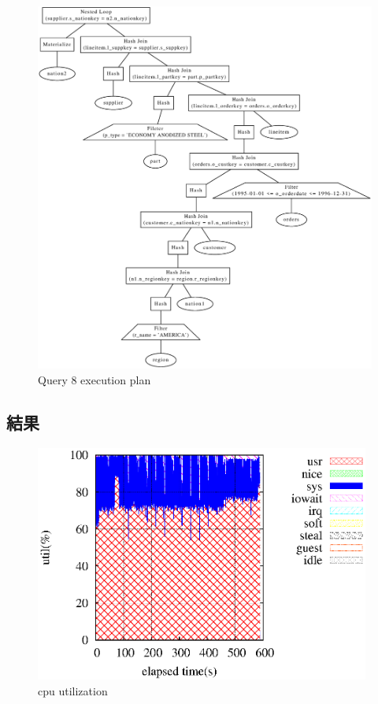 \documentclass[11pt,a4paper]{jsarticle}
\begin{document}
\begin{figure}[thbp]
 \begin{center}
  \includegraphics[width=170mm]{query8.eps}
 \end{center}
 \caption{Query 8 execution plan}
 \label{fig:query8}
\end{figure}

\clearpage
\subsection{結果}
\begin{figure}[thbp]
 \begin{center}
  \includegraphics[width=110mm]{8corecore1.eps}
 \end{center}
 \caption{cpu utilization}
 \label{fig:8cpu}
\end{figure}
\end{document}
